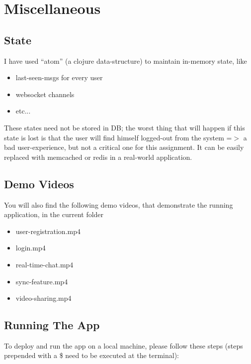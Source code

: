 \documentclass[a4paper, 10pt]{article}
\begin{document}
\section{Miscellaneous}
\subsection{State}
I have used ``atom'' (a clojure data-structure) to maintain in-memory state, like
\begin{itemize}
  \item last-seen-msgs for every user
  \item websocket channels
  \item etc...
\end{itemize}
These states need not be stored in DB; the worst thing that will happen if this state is lost is that the user will find himself logged-out from the system =$>$ a bad user-experience, but not a critical one for this assignment. It can be easily replaced with memcached or redis in a real-world application.

\subsection{Demo Videos}
You will also find the following demo videos, that demonstrate the running application, in the current folder

\begin{itemize}
  \item user-registration.mp4
  \item login.mp4
  \item real-time-chat.mp4
  \item sync-feature.mp4
  \item video-sharing.mp4
\end{itemize}

\subsection{Running The App}
To deploy and run the app on a local machine, please follow these steps (steps prepended with a \$ need to be executed at the terminal):
\end{document}
